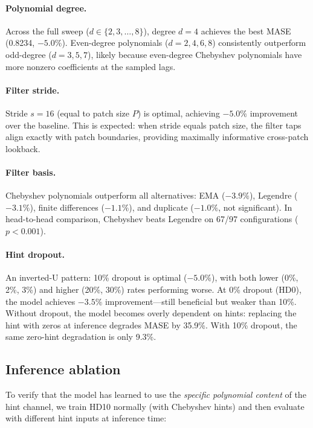 \documentclass[11pt]{article}
\begin{document}
\paragraph{Polynomial degree.} Across the full sweep ($d \in \{2, 3, \ldots, 8\}$), degree $d=4$ achieves the best MASE (0.8234, $-5.0\%$). Even-degree polynomials ($d=2, 4, 6, 8$) consistently outperform odd-degree ($d=3, 5, 7$), likely because even-degree Chebyshev polynomials have more nonzero coefficients at the sampled lags.

\paragraph{Filter stride.} Stride $s=16$ (equal to patch size $P$) is optimal, achieving $-5.0\%$ improvement over the baseline. This is expected: when stride equals patch size, the filter taps align exactly with patch boundaries, providing maximally informative cross-patch lookback.

\paragraph{Filter basis.} Chebyshev polynomials outperform all alternatives: EMA ($-3.9\%$), Legendre ($-3.1\%$), finite differences ($-1.1\%$), and duplicate ($-1.0\%$, not significant). In head-to-head comparison, Chebyshev beats Legendre on 67/97 configurations ($p < 0.001$).

\paragraph{Hint dropout.} An inverted-U pattern: 10\% dropout is optimal ($-5.0\%$), with both lower (0\%, 2\%, 3\%) and higher (20\%, 30\%) rates performing worse. At 0\% dropout (HD0), the model achieves $-3.5\%$ improvement---still beneficial but weaker than 10\%. Without dropout, the model becomes overly dependent on hints: replacing the hint with zeros at inference degrades MASE by 35.9\%. With 10\% dropout, the same zero-hint degradation is only 9.3\%.

\subsection{Inference ablation}

To verify that the model has learned to use the \emph{specific polynomial content} of the hint channel, we train HD10 normally (with Chebyshev hints) and then evaluate with different hint inputs at inference time:
\end{document}
